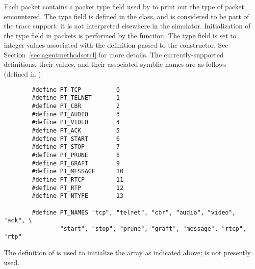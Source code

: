 \subsubsection{}

Each packet contains a packet type field used by 
to print out the type of packet encountered.
The type field is defined in the  class, and is considered
to be part of the trace support; it is not interpreted
elsewhere in the simulator.
Initialization of the type field in packets is performed by the
 function.
The type field is set to integer values associated with the
definition passed to the  constructor.
See Section~\ref{sec:agentmethodsotcl} for more details.
The currently-supported definitions, their values, and their
associated symblic names are as follows
(defined in ):
\begin{small}
\begin{verbatim}
        #define PT_TCP          0
        #define PT_TELNET       1
        #define PT_CBR          2
        #define PT_AUDIO        3
        #define PT_VIDEO        4
        #define PT_ACK          5
        #define PT_START        6
        #define PT_STOP         7
        #define PT_PRUNE        8
        #define PT_GRAFT        9
        #define PT_MESSAGE      10
        #define PT_RTCP         11
        #define PT_RTP          12
        #define PT_NTYPE        13

        #define PT_NAMES "tcp", "telnet", "cbr", "audio", "video", "ack", \
                "start", "stop", "prune", "graft", "message", "rtcp", "rtp"
\end{verbatim}
\end{small}
The definition of  is used to initialize the
 array as indicated above;
 is not presently used.

\subsubsection{}

